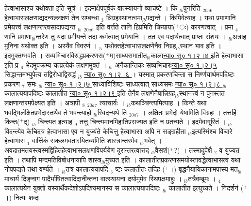 \documentclass[article,12pt,a4paper]{memoir}%
\newcommand{\add}[1]{($^{+}$#1)}
\begin{document}
	  
	  \pstart \leavevmode%
	\hphantom{.}{\color{DodgerBlue3}हेत्वाभासाश्च यथोक्ता} इति सूत्रं । इदमाक्षेपपूर्वकं {\color{DodgerBlue3}वात्स्यायनो} व्याचष्टे । {\color{DodgerBlue3}किं {\tiny $_{lb}$}पुनरिति} {\tiny $_{20a6}$} हेत्वाभासलक्षणाद्यदन्यल्लक्षणं तेन सम्बन्धा {\tiny $_{3}$} न्निग्रहस्थानत्वमा{\tiny $_{lb}$}पद्यन्ते । किमिवेत्याह । {\color{DodgerBlue3}यथा प्रमाणानि प्रमेयत्त्वं लक्षणान्तरवसादापद्यन्त} {\tiny $_{lb}$} {\tiny $_{20a6}$} इति वर्त्तते तानि हिप्रमिति क्रियाया\add{ः} कारणत्वात् । प्रमा {\tiny $_{4}$} णानि प्रमाणा{\tiny $_{lb}$}न्तरेण तु यदा प्रमीयन्ते तदा कर्मत्वात् प्रमेयानि । तत एव पदार्थत्वात् प्राप्तः संशयः । {\tiny $_{lb}$}अत्राह मुनिना यथोक्त इति । अस्यैव विवरणं । {\tiny $_{5}$} {\color{DodgerBlue3}यथोक्तहेत्वाभासलक्षणेनैव निग्रह{\tiny $_{lb}$}स्थान} भाव इति । इदमुक्तम्भवति । सव्यभिचारविरुद्धप्रकरणस\add{म}साध्यसमातीत{\tiny $_{lb}$}काला\href{http://sarit.indology.info/?cref=ns\%C5\%AB.1.2.4}{न्या० सू० १।२।४ } इति हेत्वाभासा इति प्र {\tiny $_{6}$} भेदमुपक्रम्य यत्प्रत्येकं लक्षणमुक्तं । {\tiny $_{lb}$} अनैकान्तिकः सव्यभिचारः\href{http://sarit.indology.info/?cref=ns\%C5\%AB.1.2.5}{न्या० सू० १।२।५ } सिद्धान्तमभ्युपेत्य तद्विरोधाद्विरुद्धं {\tiny $_{lb}$} \href{http://sarit.indology.info/?cref=ns\%C5\%AB.1.2.6}{न्या० सू० १।२।६ } । यस्मात् प्रकरणचिन्ता स निर्ण्णयार्थमपदिष्टः प्रकरण {\tiny $_{7}$} समः {\tiny $_{lb}$} \href{http://sarit.indology.info/?cref=ns\%C5\%AB.1.2.7}{न्या० सू० १।२।७ } साध्याविशिष्टः साध्यत्वात् साध्यसमः \href{http://sarit.indology.info/?cref=ns\%C5\%AB.1.2.8}{न्या० सू० १।२।८ } {\tiny $_{lb}$} कालात्ययापदिष्टः कालातीत \href{http://sarit.indology.info/?cref=ns\%C5\%AB.1.2.9}{न्या० सू० १।२।९ } इति तेनैव लक्षणेनैषान्निग्रह{\tiny $_{lb}$}स्थानत्त्वं न पुनस्तत लक्षणान्तरमपेक्ष्यत इति । अत्रापी {\tiny $_{8}$} {\tiny $_{20a7}$} त्याचार्यः । {\tiny $_{lb}$}कथञ्चिन्त्यमित्याह । {\color{DodgerBlue3}किन्ते यथा भवद्भिर्लक्षितप्रभेदास्तथैव ते भवन्त्याहो {\tiny $_{lb}$}स्विदन्यथे} ति {\tiny $_{20a7}$} । लक्षितः प्रभेदो येषामिति विग्रहः । तत्तर्हि किन्त\add{द्} {\tiny $_{lb}$} चिन्त्यत इत्याह {\tiny $_{9}$} \leavevmode{} तत्तु चिन्त्यमानमिहातिप्रसज्यत इति न प्रतन्यते । इदमेवागूरितं । {\tiny $_{lb}$}विदन्त्येव केचिदत्र हेत्वाभासा एव न युज्यंते केचित्तु हेत्वाभासा अपि न सङ्ग्रहीता {\tiny $_{lb}$}इत्यस्मिंश्च विचारे हेत्वाभास {\tiny $_{1}$} वार्त्तिकं सकलमवतारयितव्यमिति शास्त्रान्तरमेव {\tiny $_{lb}$}भवेत् । अवदातमतयस्त्वस्मद्विहितहेत्वाभासलक्षणविपर्ययेण दूरान्तरत्वात्तद् {\tiny $_{lb}$}वैसशं\add{?} । तस्मादुपेक्षै {\tiny $_{2}$} व युज्यत इति । तथापि मन्दमतिविबोधनायापि शास्त्र{\tiny $_{lb}$}मुच्यत इति । कालातीतप्रकरणसमयोस्तावद्धेत्वाभासत्वं यथा नोपपद्यते तथा वर्ण्यते । {\tiny $_{lb}$}तत्र {\color{DodgerBlue3}कालात्ययापदि {\tiny $_{3}$} ष्टः कलातीतः} तदिह \add{।} बृद्धनैयायिकानामपास्य मत{\tiny $_{lb}$}माचार्य {\color{DodgerBlue3}दिङ्नाग} पादैर्भाषितत्वादिदानीन्तना {\color{DodgerBlue3}वात्स्यायना} दयोमुमेव स्थिपक्षमाहुः । {\tiny $_{lb}$}तत्रैवम्ब्रूमः । {\tiny $_{4}$} कालात्ययेन युक्तो यस्यार्थैकदेशोऽपदिश्यमानस्य स कालात्ययापदिष्टः {\tiny $_{lb}$} \leavevmode{} कालातीत इत्युच्यते । निदर्शनं \add{।} नित्यः शब्दः 
\end{document}
